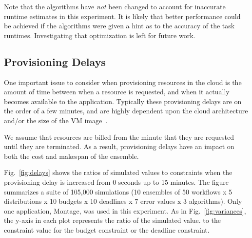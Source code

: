 \documentclass[conference]{IEEEtran}
\begin{document}
Note that the algorithms have \textit{not} been changed to account for
inaccurate runtime estimates in this experiment. It is likely that better
performance could be achieved if the algorithms were given a hint as to the
accuracy of the task runtimes. Investigating that optimization is left for
future work. 



\subsection{Provisioning Delays}
\label{sec:delays}

One important issue to consider when provisioning resources in the cloud is
the amount of time between when a resource is requested, and when it actually
becomes available to the application. Typically these provisioning delays are
on the order of a few minutes, and are highly dependent upon the cloud architecture
and/or the size of the VM image~\cite{Nurmi2008b}.

We assume that resources are billed from the minute that they are requested
until they are terminated. 
As a result, provisioning delays have an impact on both the cost  and makespan of the ensemble.

Fig.~\ref{fig:delays} shows the ratios of simulated values to constraints when
the provisioning delay is increased from 0 seconds up to 15 minutes. The
figure summarizes a suite of 105,000 simulations (10 ensembles of 50 workflows
x 5 distributions x 10 budgets x 10 deadlines x 7 error values x 3
algorithms). Only one application, Montage, was used in this experiment. As in
Fig.~\ref{fig:variances}, the y-axis in each plot represents the ratio of the simulated value.
 to the constraint value for the budget constraint or the deadline constraint. 
\end{document}
